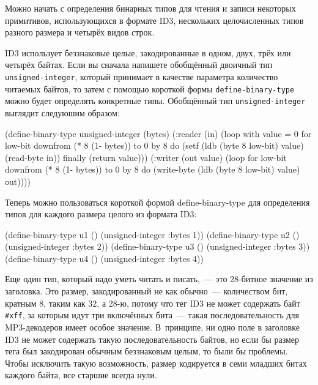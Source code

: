 Можно начать с определения бинарных типов для чтения и записи некоторых примитивов, 
использующихся в формате ID3,
нескольких целочисленных типов разного размера и четырёх видов строк.

ID3 использует беззнаковые целые, закодированные в одном, двух, трёх или четырёх байтах.
Если вы сначала напишете обобщённый двоичный тип \lstinline{unsigned-integer},
который принимает в качестве параметра количество читаемых байтов, то затем
с помощью короткой формы \lstinline{define-binary-type} можно будет определять
конкретные типы. Обобщённый тип \lstinline{unsigned-integer} выглядит следуюшим образом:
\begin{myverb}
(define-binary-type unsigned-integer (bytes)
  (:reader (in)
    (loop with value = 0
       for low-bit downfrom (* 8 (1- bytes)) to 0 by 8 do
         (setf (ldb (byte 8 low-bit) value) (read-byte in))
       finally (return value)))
  (:writer (out value)
    (loop for low-bit downfrom (* 8 (1- bytes)) to 0 by 8
       do (write-byte (ldb (byte 8 low-bit) value) out))))
\end{myverb}

Теперь можно пользоваться короткой формой define-binary-type для определения типов для
каждого размера целого из формата ID3:

\begin{myverb}
(define-binary-type u1 () (unsigned-integer :bytes 1))
(define-binary-type u2 () (unsigned-integer :bytes 2))
(define-binary-type u3 () (unsigned-integer :bytes 3))
(define-binary-type u4 () (unsigned-integer :bytes 4))
\end{myverb}

Еще один тип, который надо уметь читать и писать,~--- это 28-битное значение из заголовка.
Это размер, закодированный не как обычно~--- количеством бит, кратным 8, таким как 32, а
28-ю, потому что тег ID3 не может содержать байт \lstinline!#xff!, за
которым идут три включённых бита~--- такая последовательность для
MP3-декодеров имеет особое значение.  В~принципе, ни одно поле в заголовке ID3 не может содержать такую
последовательность байтов, но если бы размер тега был закодирован обычным беззнаковым
целым, то были бы проблемы.  Чтобы исключить такую возможность, размер кодируется в семи
младших битах каждого байта, все старшие всегда нули.

